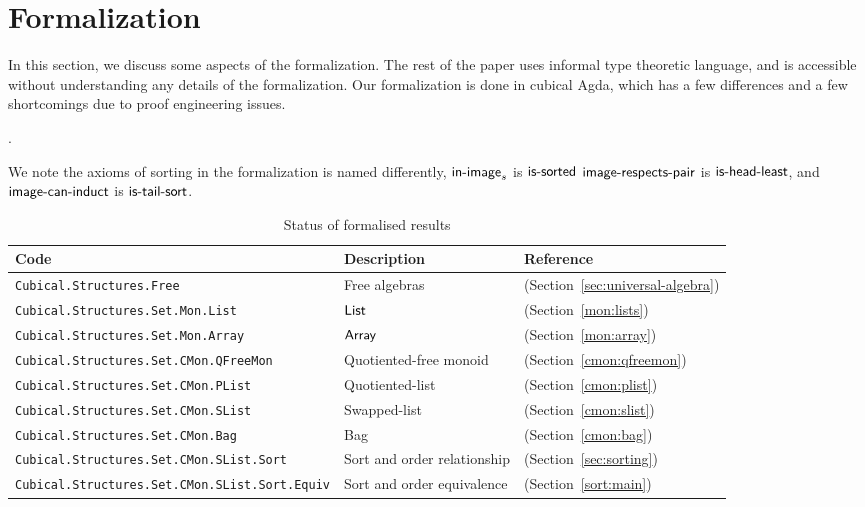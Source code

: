 \section{Formalization}
\label{sec:formalization}

In this section, we discuss some aspects of the formalization.
The rest of the paper uses informal type theoretic language,
and is accessible without understanding any details of the formalization.
Our formalization is done in cubical Agda, which has a few differences and a few
shortcomings due to proof engineering issues.

.

We note the axioms of sorting in the formalization is named differently,
$\operatorname{\mathsf{in-image}}_s$ is $\operatorname{\mathsf{is-sorted}}$
$\operatorname{\mathsf{image-respects-pair}}$ is $\operatorname{\mathsf{is-head-least}}$, and
$\operatorname{\mathsf{image-can-induct}}$ is $\operatorname{\mathsf{is-tail-sort}}$.

\begin{table}[h]
\centering
\begin{tabular}{lll}
\hline
\textbf{Code} & \textbf{Description} & \textbf{Reference}               \\ \hline
\texttt{Cubical.Structures.Free}         & Free algebras            & (Section~\ref{sec:universal-algebra}) \\
\texttt{Cubical.Structures.Set.Mon.List} & $\operatorname{\mathsf{List}}$  & (Section~\ref{mon:lists}) \\
\texttt{Cubical.Structures.Set.Mon.Array} & $\operatorname{\mathsf{Array}}$  & (Section~\ref{mon:array})\\
\texttt{Cubical.Structures.Set.CMon.QFreeMon} & Quotiented-free monoid & (Section~\ref{cmon:qfreemon}) \\
\texttt{Cubical.Structures.Set.CMon.PList} & Quotiented-list & (Section~\ref{cmon:plist}) \\
\texttt{Cubical.Structures.Set.CMon.SList} & Swapped-list & (Section~\ref{cmon:slist}) \\
\texttt{Cubical.Structures.Set.CMon.Bag} & Bag & (Section~\ref{cmon:bag}) \\
\texttt{Cubical.Structures.Set.CMon.SList.Sort} & Sort and order relationship & (Section~\ref{sec:sorting}) \\
\texttt{Cubical.Structures.Set.CMon.SList.Sort.Equiv} & Sort and order equivalence & (Section~\ref{sort:main}) \\
\hline
\end{tabular}
\caption{Status of formalised results}
\label{tab:formalised_results}
\end{table}


